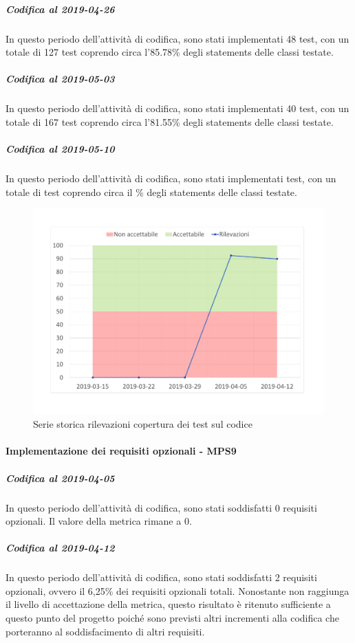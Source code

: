 \subparagraph{Codifica al 2019-04-26}
In questo periodo dell'attività di codifica, sono stati implementati 48 test, con un totale di 127 test coprendo circa l'85.78\% degli statements delle classi testate.

\subparagraph{Codifica al 2019-05-03}
In questo periodo dell'attività di codifica, sono stati implementati 40 test, con un totale di 167 test coprendo circa l'81.55\% degli statements delle classi testate.

\subparagraph{Codifica al 2019-05-10}
In questo periodo dell'attività di codifica, sono stati implementati  test, con un totale di  test coprendo circa il \% degli statements delle classi testate.

\begin{figure}[H]
	\centering
	\includegraphics[scale=0.6]{images/resoconto/MPS8Chart.pdf}
	\caption{Serie storica rilevazioni copertura dei test sul codice}	
\end{figure}


\paragraph{Implementazione dei requisiti opzionali - MPS9}
\subparagraph{Codifica al 2019-04-05}
In questo periodo dell'attività di codifica, sono stati soddisfatti 0 requisiti opzionali. Il valore della metrica rimane a 0.

\subparagraph{Codifica al 2019-04-12}
In questo periodo dell'attività di codifica, sono stati soddisfatti 2 requisiti opzionali, ovvero il 6,25\% dei requisiti opzionali totali.
Nonostante non raggiunga il livello di accettazione della
metrica, questo risultato è ritenuto sufficiente a questo punto del progetto poiché sono previsti altri incrementi alla codifica che porteranno al soddisfacimento di altri requisiti.

